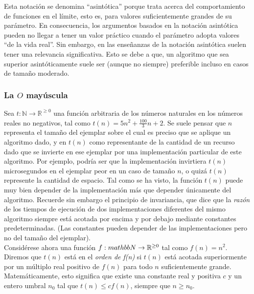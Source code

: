 \documentclass[a4paper,12pt]{article}
\begin{document}
Esta notación se denomina ``asintótica'' porque trata acerca del comportamiento de funciones en el límite, esto es, para valores suficientemente grandes de su parámetro. En consecuencia, los argumentos basados en la notación asintótica pueden no llegar a tener un valor práctico cuando el parámetro adopta valores ``de la vida real''. Sin embargo, en las enseñanzas de la notación asintótica suelen tener una relevancia significativa. Esto se debe a que, un algoritmo que sea superior asintóticamente suele ser (aunque no siempre) preferible incluso en casos de tamaño moderado.\\

\subsubsection{La $O$ mayúscula}

Sea $t: \mathbb{N} \rightarrow \mathbb{R}^{\geq 0}$ una función arbitraria de los números naturales en los números reales no negativos, tal como $t(n) = 5n^2 + \frac{100}{3}n + 2$. Se suele pensar que $n$ representa el tamaño del ejemplar sobre el cual es preciso que se aplique un algoritmo dado, y en $t(n)$ como representante de la cantidad de un recurso dado que se invierte en ese ejemplar por una implementación particular de este algoritmo. Por ejemplo, podría ser que la implementación invirtiera $t(n)$ microsegundos en el ejemplar peor en un caso de tamaño $n$, o quizá $t(n)$ represente la cantidad de espacio. Tal como se ha visto, la función $t(n)$ puede muy bien depender de la implementación más que depender únicamente del algoritmo. Recuerde sin embargo el principio de invariancia, que dice que la \emph{razón} de los tiempos de ejecución de dos implementaciones diferentes del mismo algoritmo siempre está acotada por encima y por debajo mediante constantes predeterminadas. (Las constantes pueden depender de las implementaciones pero no del tamaño del ejemplar).\\

Considérese ahora una función $f: \\mathbb{N} \rightarrow \mathbb{R}^{\geq 0}$ tal como $f(n) = n^2$. Diremos que $t(n)$ está en el \emph{orden de f(n)} si $t(n)$ está acotada superiormente por un múltiplo real positivo de $f(n)$ para todo $n$ suficientemente grande. Matemáticamente, esto significa que existe una constante real y positiva $c$ y un entero umbral $n_0$ tal que $t(n) \leq cf(n)$, siempre que $n \geq n_0$.\\
\end{document}
